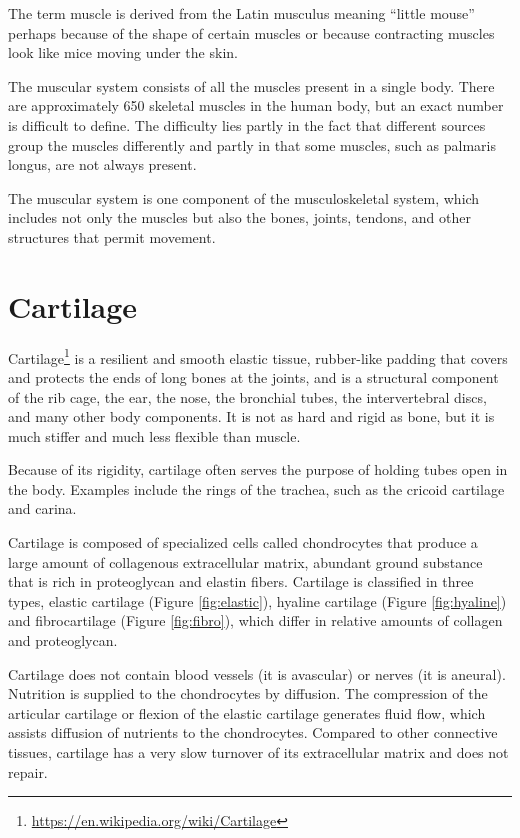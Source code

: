 \documentclass[]{book}
\let\rmarkdownfootnote\footnote%
\def\footnote{\protect\rmarkdownfootnote}
\renewcommand{\href}[2]{#2\footnote{\url{#1}}}
\begin{document}
The term muscle is derived from the Latin musculus meaning ``little mouse'' perhaps because of the shape of certain muscles or because contracting muscles look like mice moving under the skin.

The muscular system consists of all the muscles present in a single body. There are approximately 650 skeletal muscles in the human body, but an exact number is difficult to define. The difficulty lies partly in the fact that different sources group the muscles differently and partly in that some muscles, such as palmaris longus, are not always present.

The muscular system is one component of the musculoskeletal system, which includes not only the muscles but also the bones, joints, tendons, and other structures that permit movement.

\hypertarget{cartilage}{%
\section{Cartilage}\label{cartilage}}

\href{https://en.wikipedia.org/wiki/Cartilage}{Cartilage} is a resilient and smooth elastic tissue, rubber-like padding that covers and protects the ends of long bones at the joints, and is a structural component of the rib cage, the ear, the nose, the bronchial tubes, the intervertebral discs, and many other body components. It is not as hard and rigid as bone, but it is much stiffer and much less flexible than muscle.

Because of its rigidity, cartilage often serves the purpose of holding tubes open in the body. Examples include the rings of the trachea, such as the cricoid cartilage and carina.

Cartilage is composed of specialized cells called chondrocytes that produce a large amount of collagenous extracellular matrix, abundant ground substance that is rich in proteoglycan and elastin fibers. Cartilage is classified in three types, elastic cartilage (Figure \ref{fig:elastic}), hyaline cartilage (Figure \ref{fig:hyaline}) and fibrocartilage (Figure \ref{fig:fibro}), which differ in relative amounts of collagen and proteoglycan.

Cartilage does not contain blood vessels (it is avascular) or nerves (it is aneural). Nutrition is supplied to the chondrocytes by diffusion. The compression of the articular cartilage or flexion of the elastic cartilage generates fluid flow, which assists diffusion of nutrients to the chondrocytes. Compared to other connective tissues, cartilage has a very slow turnover of its extracellular matrix and does not repair.
\end{document}
